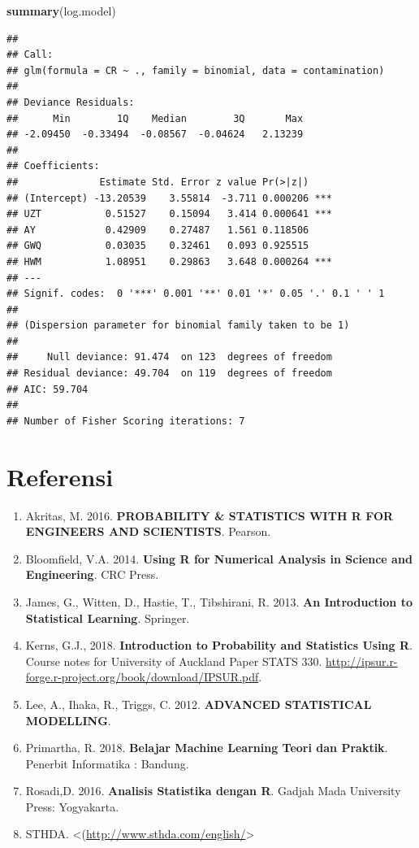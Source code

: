 \documentclass[]{book}
\newenvironment{Shaded}{\begin{snugshade}}{\end{snugshade}}
\newcommand{\KeywordTok}[1]{\textcolor[rgb]{0.13,0.29,0.53}{\textbf{#1}}}
\newcommand{\NormalTok}[1]{#1}
\providecommand{\tightlist}{%
  \setlength{\itemsep}{0pt}\setlength{\parskip}{0pt}}
\theoremstyle{definition}
\theoremstyle{definition}
\theoremstyle{definition}
\theoremstyle{remark}
\begin{document}
\begin{Shaded}
\begin{Highlighting}[]
\KeywordTok{summary}\NormalTok{(log.model)}
\end{Highlighting}
\end{Shaded}

\begin{verbatim}
## 
## Call:
## glm(formula = CR ~ ., family = binomial, data = contamination)
## 
## Deviance Residuals: 
##      Min        1Q    Median        3Q       Max  
## -2.09450  -0.33494  -0.08567  -0.04624   2.13239  
## 
## Coefficients:
##              Estimate Std. Error z value Pr(>|z|)    
## (Intercept) -13.20539    3.55814  -3.711 0.000206 ***
## UZT           0.51527    0.15094   3.414 0.000641 ***
## AY            0.42909    0.27487   1.561 0.118506    
## GWQ           0.03035    0.32461   0.093 0.925515    
## HWM           1.08951    0.29863   3.648 0.000264 ***
## ---
## Signif. codes:  0 '***' 0.001 '**' 0.01 '*' 0.05 '.' 0.1 ' ' 1
## 
## (Dispersion parameter for binomial family taken to be 1)
## 
##     Null deviance: 91.474  on 123  degrees of freedom
## Residual deviance: 49.704  on 119  degrees of freedom
## AIC: 59.704
## 
## Number of Fisher Scoring iterations: 7
\end{verbatim}

\hypertarget{referensi-10}{%
\section{Referensi}\label{referensi-10}}

\begin{enumerate}
\def\labelenumi{\arabic{enumi}.}
\tightlist
\item
  Akritas, M. 2016. \textbf{PROBABILITY \& STATISTICS WITH R FOR ENGINEERS AND SCIENTISTS}. Pearson.
\item
  Bloomfield, V.A. 2014. \textbf{Using R for Numerical Analysis in Science and Engineering}. CRC Press.
\item
  James, G., Witten, D., Hastie, T., Tibshirani, R. 2013. \textbf{An Introduction to Statistical Learning}. Springer.
\item
  Kerns, G.J., 2018. \textbf{Introduction to Probability and Statistics Using R}. Course notes for University of Auckland Paper STATS 330. \url{http://ipsur.r-forge.r-project.org/book/download/IPSUR.pdf}.
\item
  Lee, A., Ihaka, R., Triggs, C. 2012. \textbf{ADVANCED STATISTICAL MODELLING}.
\item
  Primartha, R. 2018. \textbf{Belajar Machine Learning Teori dan Praktik}. Penerbit Informatika : Bandung.
\item
  Rosadi,D. 2016. \textbf{Analisis Statistika dengan R}. Gadjah Mada University Press: Yogyakarta.
\item
  STHDA. \textless{}(\url{http://www.sthda.com/english/}\textgreater{}
\end{enumerate}


\end{document}
